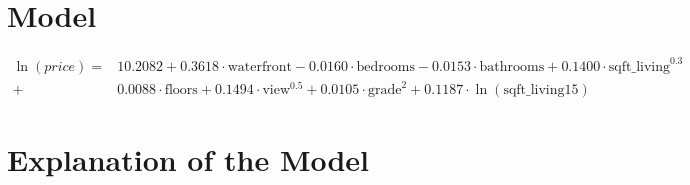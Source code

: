 \documentclass[10pt]{article}
\begin{document}
	\nopagebreak
\section*{Model}
\begin{align*}
	\ln(price) =& 10.2082 + 0.3618\cdot \text{waterfront} - 0.0160\cdot\text{bedrooms} -0.0153 \cdot\text{bathrooms} +0.1400\cdot\text{sqft\_living}^{0.3} \\ +& 0.0088 \cdot \text{floors}
	+ 0.1494\cdot\text{view}^{0.5}+ 0.0105\cdot\text{grade}^2+0.1187\cdot\ln\left(\text{sqft\_living15}\right)
\end{align*}
\section*{Explanation of the Model}
\end{document}
